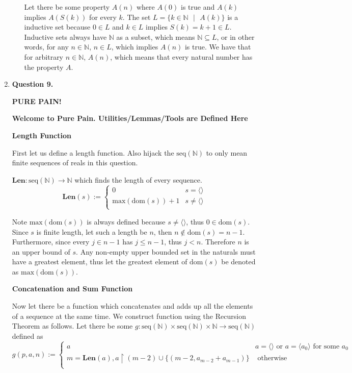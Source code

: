 \documentclass{article}
\newcommand{ \len }[0]{ \textbf{Len} }
\newcommand{ \seqnat }[0]{ \text{seq}(\mathbb{N}) }
\newcommand{ \Max }[0]{\text{max}}
\newcommand{ \dom }[0]{\text{dom}}
\begin{document}
\begin{enumerate}
\begin{enumerate}
			Let there be some property $A(n)$ where $A(0)$ is true and $A(k)$ implies $A(S(k))$ for every $k$. The set $L = \{k \in \mathbb{N} \text{ } | \text{ } A(k)\}$ is a inductive set because $0 \in L$ and $k \in L$ implies $S(k) = k + 1 \in L$. Inductive sets always have $\mathbb{N}$ as a subset, which means $\mathbb{N} \subseteq L$, or in other words, for any $n \in \mathbb{N}$, $n \in L$, which implies $A(n)$ is true. We have that for arbitrary $n \in \mathbb{N}$, $A(n)$, which means that every natural number has the property $A$.

		\end{enumerate}
		
		\newpage
		\item \textbf{Question 9.}
		\medskip
		
		\textbf{PURE PAIN!}
		
		\medskip		
		\textbf{Welcome to Pure Pain. Utilities/Lemmas/Tools are Defined Here}
		\medskip
		
		\medskip
		\textbf{Length Function}
		\medskip
		
		First let us define a length function. Also hijack the $\text{seq}(\mathbb{N})$ to only mean finite sequences of reals in this question.
		
		$\len: \text{seq}(\mathbb{N}) \xrightarrow{} \mathbb{N}$ which finds the length of every sequence.
		$$\len(s) := \begin{cases}
			0 & s = \langle \rangle\\
			\Max(\dom(s)) + 1 & s \neq \langle \rangle\\
		\end{cases}$$
		
		Note $\Max(\dom(s))$ is always defined because $s \neq \langle \rangle$, thus $0 \in \dom(s)$. Since $s$ is finite length, let such a length be $n$, then $n \notin \dom(s) = n - 1$. Furthermore, since every $j \in n - 1$ has $j \leq n - 1$, thus $j < n$. Therefore $n$ is an upper bound of $s$. Any non-empty upper bounded set in the naturals must have a greatest element, thus let the greatest element of $\dom(s)$ be denoted as $\Max(\dom(s))$.
		
		\medskip
		\textbf{Concatenation and Sum Function}
		\medskip
		
		Now let there be a function which concatenates and adds up all the elements of a sequence at the same time. We construct function using the Recursion Theorem as follows. Let there be some $g: \seqnat \times \seqnat \times \mathbb{N} \xrightarrow{} \seqnat$ defined as 
		$$g(p, a, n) := \begin{cases}
			a & a = \langle \rangle \text{ or } a = \langle a_0 \rangle \text{ for some } a_0\\
			m = \len(a), a \upharpoonright (m - 2) \cup \{(m - 2, a_{m - 2} + a_{m - 1})\} & \text{ otherwise }\\
		\end{cases}$$
		

\end{enumerate}
\end{document}
